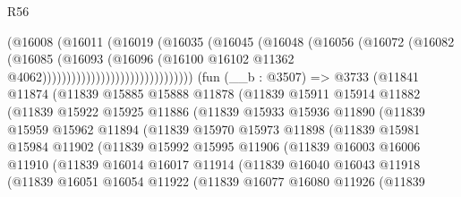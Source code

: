 \begin{lexlean}{R56}
\begin{coremodule}
                                        (@16008
                                          (@16011
                                            (@16019
                                              (@16035
                                                (@16045
                                                  (@16048
                                                    (@16056
                                                      (@16072
                                                        (@16082
                                                          (@16085
                                                            (@16093
                                                              (@16096
                                                                (@16100
                                                                  @16102
                                                                  @11362
                                                                  @4062)))))))))))))))))))))))))))))))
    (fun (__b : @3507) =>
    @3733
      (@11841
        @11874
        (@11839
          @15885
          @15888
          @11878
          (@11839
            @15911
            @15914
            @11882
            (@11839
              @15922
              @15925
              @11886
              (@11839
                @15933
                @15936
                @11890
                (@11839
                  @15959
                  @15962
                  @11894
                  (@11839
                    @15970
                    @15973
                    @11898
                    (@11839
                      @15981
                      @15984
                      @11902
                      (@11839
                        @15992
                        @15995
                        @11906
                        (@11839
                          @16003
                          @16006
                          @11910
                          (@11839
                            @16014
                            @16017
                            @11914
                            (@11839
                              @16040
                              @16043
                              @11918
                              (@11839
                                @16051
                                @16054
                                @11922
                                (@11839
                                  @16077
                                  @16080
                                  @11926
                                  (@11839

\end{coremodule}
\end{lexlean}
